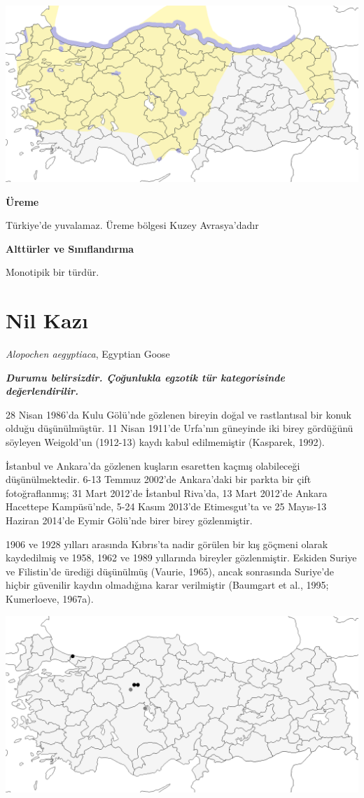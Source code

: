 \documentclass[
  a4paper,
  DIV=11,
  numbers=noendperiod]{scrartcl}
\begin{document}
\includegraphics{images/harita_Cygnus cygnus.png}

\textbf{Üreme}

Türkiye'de yuvalamaz. Üreme bölgesi Kuzey Avrasya'dadır

\textbf{Alttürler ve Sınıflandırma}

Monotipik bir türdür.

\section{Nil Kazı}\label{nil-kazux131}

\emph{Alopochen aegyptiaca}, Egyptian Goose

\textbf{\emph{Durumu belirsizdir. Çoğunlukla egzotik tür kategorisinde
değerlendirilir.}}

28 Nisan 1986'da Kulu Gölü'nde gözlenen bireyin doğal ve rastlantısal
bir konuk olduğu düşünülmüştür. 11 Nisan 1911'de Urfa'nın güneyinde iki
birey gördüğünü söyleyen Weigold'un (1912-13) kaydı kabul edilmemiştir
(Kasparek, 1992).

İstanbul ve Ankara'da gözlenen kuşların esaretten kaçmış olabileceği
düşünülmektedir. 6-13 Temmuz 2002'de Ankara'daki bir parkta bir çift
fotoğraflanmış; 31 Mart 2012'de İstanbul Riva'da, 13 Mart 2012'de Ankara
Hacettepe Kampüsü'nde, 5-24 Kasım 2013'de Etimesgut'ta ve 25 Mayıs-13
Haziran 2014'de Eymir Gölü'nde birer birey gözlenmiştir.

1906 ve 1928 yılları arasında Kıbrıs'ta nadir görülen bir kış göçmeni
olarak kaydedilmiş ve 1958, 1962 ve 1989 yıllarında bireyler
gözlenmiştir. Eskiden Suriye ve Filistin'de ürediği düşünülmüş (Vaurie,
1965), ancak sonrasında Suriye'de hiçbir güvenilir kaydın olmadığına
karar verilmiştir (Baumgart et al., 1995; Kumerloeve, 1967a).

\includegraphics{images/harita_Alopochen aegyptiaca.png}
\end{document}
